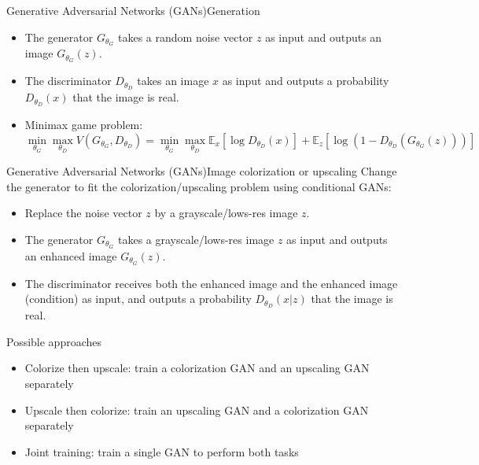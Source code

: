 \documentclass[aspectratio=169]{beamer}
\theoremstyle{definition}
\begin{document}
\begin{frame}{Generative Adversarial Networks (GANs)}{Generation}
    \begin{itemize}
        \item The generator $G_{\theta_G}$ takes a random noise vector $z$ as input and outputs an image $G_{\theta_G}(z)$.
        \item The discriminator $D_{\theta_D}$ takes an image $x$ as input and outputs a probability $D_{\theta_D}(x)$ that the image is real.
        \item Minimax game problem:
        \begin{equation*}
            \min_{\theta_G}\max_{\theta_D} V(G_{\theta_G}, D_{\theta_D}) = \min_{\theta_G}\max_{\theta_D}\mathbb{E}_x[\log D_{\theta_D}(x)] + \mathbb{E}_z[\log(1 - D_{\theta_D}(G_{\theta_G}(z)))]
        \end{equation*}
    \end{itemize}
\end{frame}

\begin{frame}{Generative Adversarial Networks (GANs)}{Image colorization or upscaling}
    Change the generator to fit the colorization/upscaling problem using conditional GANs:
    \begin{itemize}
        \item Replace the noise vector $z$ by a grayscale/lows-res image $z$.
        \item The generator $G_{\theta_G}$ takes a grayscale/lows-res image $z$ as input and outputs an enhanced image $G_{\theta_G}(z)$.
        \item The discriminator receives both the enhanced image and the enhanced image (condition) as input, and outputs a probability $D_{\theta_D}(x|z)$ that the image is real.
    \end{itemize}
\end{frame}

\begin{frame}{Possible approaches}
    \begin{itemize}
        \item Colorize then upscale: train a colorization GAN and an upscaling GAN separately
        \item Upscale then colorize: train an upscaling GAN and a colorization GAN separately
        \item Joint training: train a single GAN to perform both tasks
    \end{itemize}
\end{frame}
\end{document}
